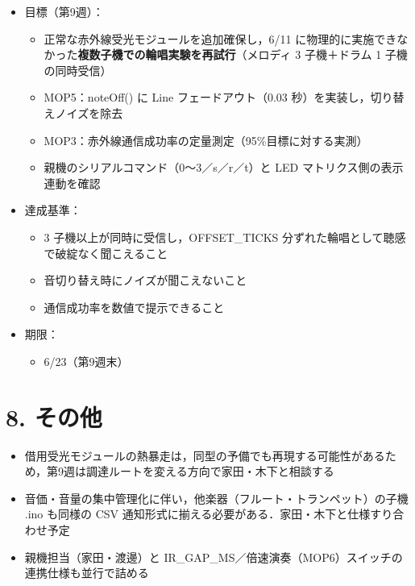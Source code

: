 \documentclass[a4paper,11pt]{ltjsarticle}
\providecommand{\％}{\%}
\begin{document}
\begin{itemize}
    \item 目標（第9週）：
    \begin{itemize}
        \item 正常な赤外線受光モジュールを追加確保し，6/11 に物理的に実施できなかった\textbf{複数子機での輪唱実験を再試行}（メロディ 3 子機＋ドラム 1 子機の同時受信）
        \item MOP5：noteOff() に Line フェードアウト（0.03 秒）を実装し，切り替えノイズを除去
        \item MOP3：赤外線通信成功率の定量測定（95\％目標に対する実測）
        \item 親機のシリアルコマンド（0〜3／s／r／t）と LED マトリクス側の表示連動を確認
    \end{itemize}
    \item 達成基準：
    \begin{itemize}
        \item 3 子機以上が同時に受信し，OFFSET\_TICKS 分ずれた輪唱として聴感で破綻なく聞こえること
        \item 音切り替え時にノイズが聞こえないこと
        \item 通信成功率を数値で提示できること
    \end{itemize}
    \item 期限：
    \begin{itemize}
        \item 6/23（第9週末）
    \end{itemize}
\end{itemize}

\section{8. その他}

\begin{itemize}
    \item 借用受光モジュールの熱暴走は，同型の予備でも再現する可能性があるため，第9週は調達ルートを変える方向で家田・木下と相談する
    \item 音価・音量の集中管理化に伴い，他楽器（フルート・トランペット）の子機 .ino も同様の CSV 通知形式に揃える必要がある．家田・木下と仕様すり合わせ予定
    \item 親機担当（家田・渡邊）と IR\_GAP\_MS／倍速演奏（MOP6）スイッチの連携仕様も並行で詰める
\end{itemize}

\end{document}
